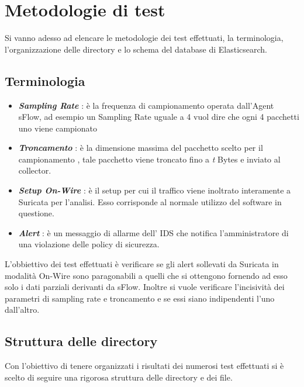 \documentclass[12pt,a4paper,openright,twoside]{report}
\begin{document}
\section{Metodologie di test}

Si vanno adesso ad elencare le metodologie dei test effettuati, la terminologia, l'organizzazione delle
directory e lo schema del database di Elasticsearch.

\subsection{Terminologia}

\begin{itemize}
  \item {\it \bf Sampling Rate} : \`e la frequenza di campionamento operata dall'Agent sFlow,
  ad esempio un Sampling Rate uguale a 4 vuol dire che ogni 4 pacchetti uno viene
  campionato
  \item {\it \bf Troncamento} : \`e la dimensione massima del pacchetto scelto per il campionamento
  , tale pacchetto viene troncato fino a {\it t} Bytes e inviato al collector.
  \item {\it \bf Setup On-Wire} : \`e il setup per cui il traffico viene inoltrato interamente
  a Suricata per l'analisi. Esso corrisponde al normale utilizzo del software in questione.
  \item {\it \bf Alert} : \`e un messaggio di allarme dell' IDS che notifica l'amministratore
  di una violazione delle policy di sicurezza.
\end{itemize}


L'obbiettivo dei test effettuati  \`e verificare se gli alert sollevati da Suricata
in modalit\`a On-Wire sono paragonabili a quelli che si ottengono fornendo ad esso solo
i dati parziali derivanti da sFlow.
Inoltre si vuole verificare l'incisivit\`a dei parametri di sampling rate e troncamento e
se essi siano indipendenti l'uno dall'altro.

\subsection{Struttura delle directory}\label{sec:struttura-dir}

Con l'obiettivo di tenere organizzati i risultati dei numerosi test effettuati si
\`e scelto di seguire una rigorosa struttura delle directory e dei file.
\end{document}
